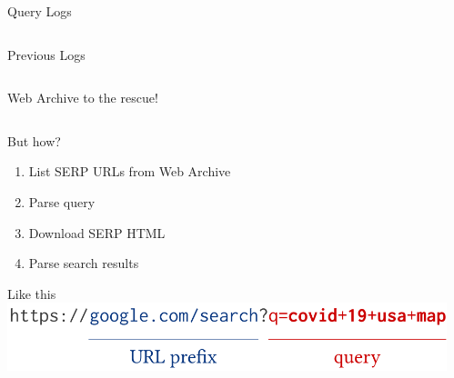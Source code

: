\documentclass[english,xcolor=x11names]{beamer}
\begin{document}
\begin{frame}{Query Logs}
\begin{columns}
{\begin{column}{0.45\linewidth}
\begin{center}
          Previous Logs
          \vspace{5ex}
        \end{center}
      \end{column}
    }
  \end{columns}
\end{frame}

\begin{frame}{Web Archive to the rescue!}
  \begin{columns}
    \begin{column}{0.55\linewidth}
      \begin{block}{But how?}
        \vspace{1ex}
        \begin{enumerate}
          \item List SERP URLs from Web Archive
          \item Parse query
          \item Download SERP HTML
          \item Parse search results
        \end{enumerate}
      \end{block}
      \vspace{4ex}
      \begin{block}{Like this\textellipsis}
        \vspace{2ex}
        \includegraphics[width=1.1\linewidth]{url-pattern}\\
      \end{block}
    \end{column}
    \begin{column}{0.45\linewidth}
      \begin{center}
        \vspace*{-3ex}

\end{center}
\end{column}
\end{columns}
\end{frame}
\end{document}
